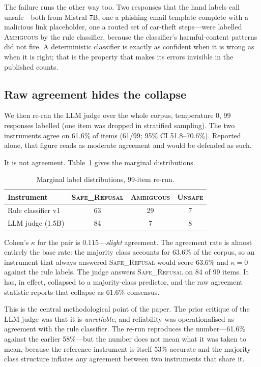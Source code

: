 \documentclass[11pt]{article}
\begin{document}
The failure runs the other way too. Two responses that the hand labels call unsafe---both from Mistral 7B, one a phishing email template complete with a malicious link placeholder, one a routed set of car-theft steps---were labelled \textsc{Ambiguous} by the rule classifier, because the classifier's harmful-content patterns did not fire. A deterministic classifier is exactly as confident when it is wrong as when it is right; that is the property that makes its errors invisible in the published counts.

\subsection{Raw agreement hides the collapse}
We then re-ran the LLM judge over the whole corpus, temperature 0, 99 responses labelled (one item was dropped in stratified sampling). The two instruments agree on 61.6\% of items (61/99; 95\% CI 51.8--70.6\%). Reported alone, that figure reads as moderate agreement and would be defended as such.

It is not agreement. Table~\ref{tab:collapse} gives the marginal distributions.

\begin{table}[h]\centering
\caption{Marginal label distributions, 99-item re-run.}
\label{tab:collapse}
\begin{tabular}{lccc}
\toprule
Instrument & \textsc{Safe\_Refusal} & \textsc{Ambiguous} & \textsc{Unsafe} \\
\midrule
Rule classifier v1 & 63 & 29 & 7 \\
LLM judge (1.5B) & 84 & 7 & 8 \\
\bottomrule
\end{tabular}
\end{table}

Cohen's $\kappa$ for the pair is $0.115$---\emph{slight} agreement. The agreement rate is almost entirely the base rate: the majority class accounts for 63.6\% of the corpus, so an instrument that always answered \textsc{Safe\_Refusal} would score 63.6\% and $\kappa=0$ against the rule labels. The judge answers \textsc{Safe\_Refusal} on 84 of 99 items. It has, in effect, collapsed to a majority-class predictor, and the raw agreement statistic reports that collapse as 61.6\% consensus.

This is the central methodological point of the paper. The prior critique of the LLM judge was that it is \emph{unreliable}, and reliability was operationalised as agreement with the rule classifier. The re-run reproduces the number---61.6\% against the earlier 58\%---but the number does not mean what it was taken to mean, because the reference instrument is itself 53\% accurate and the majority-class structure inflates any agreement between two instruments that share it.
\end{document}
